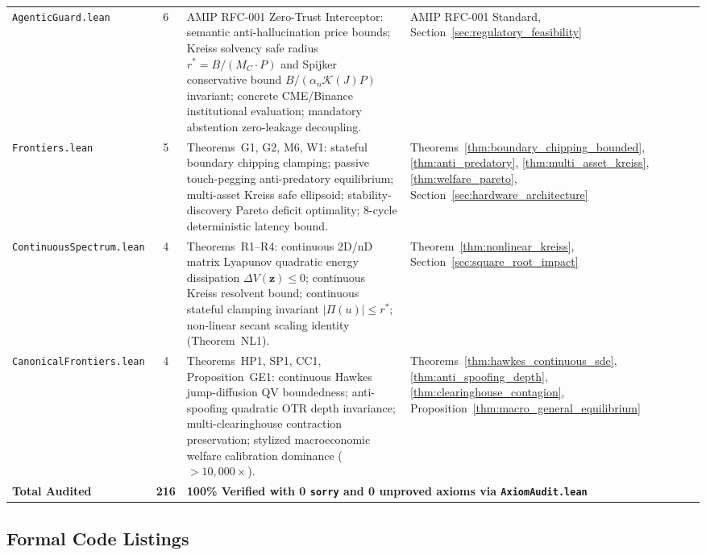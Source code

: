 \documentclass[10pt,twocolumn,letterpaper]{article}
\theoremstyle{definition}
\theoremstyle{remark}
\begin{document}
\begin{table}[htbp]
\begin{tabularx}{\textwidth}{lcp{}p{}}
\texttt{AgenticGuard.lean} & 6 & AMIP RFC-001 Zero-Trust Interceptor: semantic anti-hallucination price bounds; Kreiss solvency safe radius $r^* = B / (M_C \cdot P)$ and Spijker conservative bound $B / (\alpha_n \mathcal{K}(J) P)$ invariant; concrete CME/Binance institutional evaluation; mandatory abstention zero-leakage decoupling. & AMIP RFC-001 Standard, Section~\ref{sec:regulatory_feasibility} \\
\texttt{Frontiers.lean} & 5 & Theorems~G1, G2, M6, W1: stateful boundary chipping clamping; passive touch-pegging anti-predatory equilibrium; multi-asset Kreiss safe ellipsoid; stability-discovery Pareto deficit optimality; 8-cycle deterministic latency bound. & Theorems~\ref{thm:boundary_chipping_bounded}, \ref{thm:anti_predatory}, \ref{thm:multi_asset_kreiss}, \ref{thm:welfare_pareto}, Section~\ref{sec:hardware_architecture} \\
\texttt{ContinuousSpectrum.lean} & 4 & Theorems~R1--R4: continuous 2D/nD matrix Lyapunov quadratic energy dissipation $\Delta V(\mathbf{z}) \le 0$; continuous Kreiss resolvent bound; continuous stateful clamping invariant $|\Pi(u)| \le r^*$; non-linear secant scaling identity (Theorem~NL1). & Theorem~\ref{thm:nonlinear_kreiss}, Section~\ref{sec:square_root_impact} \\
\texttt{CanonicalFrontiers.lean} & 4 & Theorems~HP1, SP1, CC1, Proposition~GE1: continuous Hawkes jump-diffusion QV boundedness; anti-spoofing quadratic OTR depth invariance; multi-clearinghouse contraction preservation; stylized macroeconomic welfare calibration dominance ($>10{,}000\times$). & Theorems~\ref{thm:hawkes_continuous_sde}, \ref{thm:anti_spoofing_depth}, \ref{thm:clearinghouse_contagion}, Proposition~\ref{thm:macro_general_equilibrium} \\
\midrule
\textbf{Total Audited} & \textbf{216} & \multicolumn{2}{l}{\textbf{100\% Verified with 0 \texttt{sorry} and 0 unproved axioms via \texttt{AxiomAudit.lean}}} \\
\bottomrule
\end{tabularx}
\end{table}

\subsection{Formal Code Listings}
\end{document}
